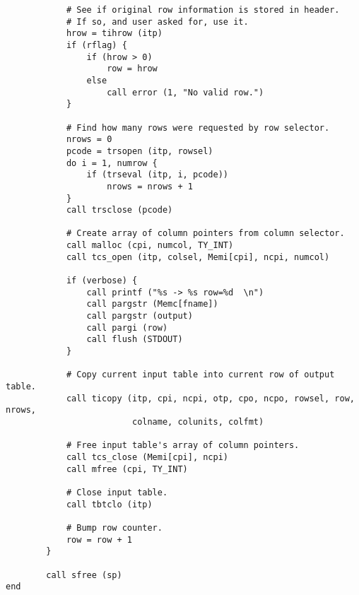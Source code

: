 \begin{verbatim}
            # See if original row information is stored in header.
            # If so, and user asked for, use it.
            hrow = tihrow (itp)
            if (rflag) {
                if (hrow > 0)
                    row = hrow
                else
                    call error (1, "No valid row.")
            }

            # Find how many rows were requested by row selector.
            nrows = 0
            pcode = trsopen (itp, rowsel)
            do i = 1, numrow {
                if (trseval (itp, i, pcode))
                    nrows = nrows + 1
            }
            call trsclose (pcode)

            # Create array of column pointers from column selector. 
            call malloc (cpi, numcol, TY_INT)
            call tcs_open (itp, colsel, Memi[cpi], ncpi, numcol)

            if (verbose) {
                call printf ("%s -> %s row=%d  \n")
                call pargstr (Memc[fname])
                call pargstr (output)
                call pargi (row)
                call flush (STDOUT)
            }

            # Copy current input table into current row of output table.
            call ticopy (itp, cpi, ncpi, otp, cpo, ncpo, rowsel, row, nrows,
                         colname, colunits, colfmt)

            # Free input table's array of column pointers.
            call tcs_close (Memi[cpi], ncpi)
            call mfree (cpi, TY_INT)

            # Close input table.
            call tbtclo (itp)

            # Bump row counter.
            row = row + 1
        }

        call sfree (sp)
end
\end{verbatim}
\newpage
{}
